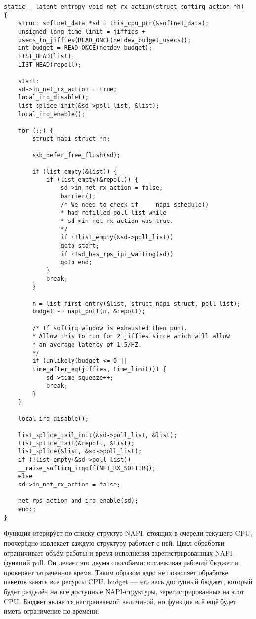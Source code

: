 \begin{center}
	\captionsetup{justification=raggedright,singlelinecheck=off}
	\begin{lstlisting}[label=lst:net_rx_action,caption=Функция net\_rx\_action,showstringspaces=false]
static __latent_entropy void net_rx_action(struct softirq_action *h)
{
	struct softnet_data *sd = this_cpu_ptr(&softnet_data);
	unsigned long time_limit = jiffies +
	usecs_to_jiffies(READ_ONCE(netdev_budget_usecs));
	int budget = READ_ONCE(netdev_budget);
	LIST_HEAD(list);
	LIST_HEAD(repoll);
	
	start:
	sd->in_net_rx_action = true;
	local_irq_disable();
	list_splice_init(&sd->poll_list, &list);
	local_irq_enable();
	
	for (;;) {
		struct napi_struct *n;
		
		skb_defer_free_flush(sd);
		
		if (list_empty(&list)) {
			if (list_empty(&repoll)) {
				sd->in_net_rx_action = false;
				barrier();
				/* We need to check if ____napi_schedule()
				* had refilled poll_list while
				* sd->in_net_rx_action was true.
				*/
				if (!list_empty(&sd->poll_list))
				goto start;
				if (!sd_has_rps_ipi_waiting(sd))
				goto end;
			}
			break;
		}
		
		n = list_first_entry(&list, struct napi_struct, poll_list);
		budget -= napi_poll(n, &repoll);
		
		/* If softirq window is exhausted then punt.
		* Allow this to run for 2 jiffies since which will allow
		* an average latency of 1.5/HZ.
		*/
		if (unlikely(budget <= 0 ||
		time_after_eq(jiffies, time_limit))) {
			sd->time_squeeze++;
			break;
		}
	}
	
	local_irq_disable();
	
	list_splice_tail_init(&sd->poll_list, &list);
	list_splice_tail(&repoll, &list);
	list_splice(&list, &sd->poll_list);
	if (!list_empty(&sd->poll_list))
	__raise_softirq_irqoff(NET_RX_SOFTIRQ);
	else
	sd->in_net_rx_action = false;
	
	net_rps_action_and_irq_enable(sd);
	end:;
}
	\end{lstlisting}
\end{center}
\FloatBarrier

Функция итерирует по списку структур NAPI, стоящих в очереди текущего CPU, поочерёдно извлекает каждую структуру работает с ней. Цикл обработки ограничивает объём работы и время исполнения зарегистрированных NAPI-функций poll. Он делает это двумя способами: отслеживая рабочий бюджет и проверяет затраченное время. Таким образом ядро не позволяет обработке пакетов занять все ресурсы CPU. budget — это весь доступный бюджет, который будет разделён на все доступные NAPI-структуры, зарегистрированные на этот CPU. Бюджет является настраиваемой величиной, но функция всё ещё будет иметь ограничение по времени.

